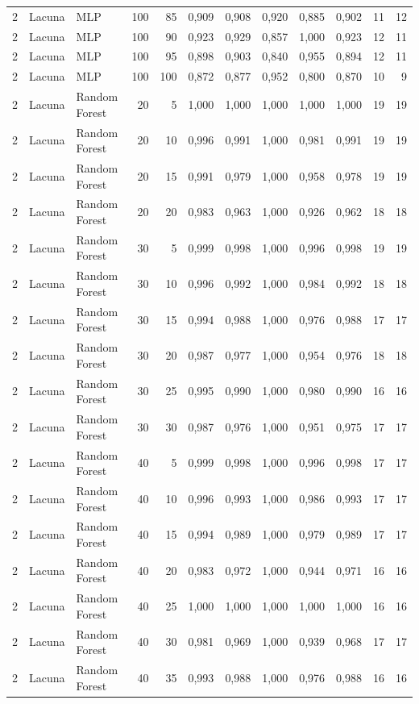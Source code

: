 \begin{longtable}{@{}rllrrrrrrrrr@{}}
2 & Lacuna & MLP & 100 & 85 & 0,909 & 0,908 & 0,920 & 0,885 & 0,902 & 11 & 12 \\
2 & Lacuna & MLP & 100 & 90 & 0,923 & 0,929 & 0,857 & 1,000 & 0,923 & 12 & 11 \\
2 & Lacuna & MLP & 100 & 95 & 0,898 & 0,903 & 0,840 & 0,955 & 0,894 & 12 & 11 \\
2 & Lacuna & MLP & 100 & 100 & 0,872 & 0,877 & 0,952 & 0,800 & 0,870 & 10 & 9 \\
2 & Lacuna & Random Forest & 20 & 5 & 1,000 & 1,000 & 1,000 & 1,000 & 1,000 & 19 & 19 \\
2 & Lacuna & Random Forest & 20 & 10 & 0,996 & 0,991 & 1,000 & 0,981 & 0,991 & 19 & 19 \\
2 & Lacuna & Random Forest & 20 & 15 & 0,991 & 0,979 & 1,000 & 0,958 & 0,978 & 19 & 19 \\
2 & Lacuna & Random Forest & 20 & 20 & 0,983 & 0,963 & 1,000 & 0,926 & 0,962 & 18 & 18 \\
2 & Lacuna & Random Forest & 30 & 5 & 0,999 & 0,998 & 1,000 & 0,996 & 0,998 & 19 & 19 \\
2 & Lacuna & Random Forest & 30 & 10 & 0,996 & 0,992 & 1,000 & 0,984 & 0,992 & 18 & 18 \\
2 & Lacuna & Random Forest & 30 & 15 & 0,994 & 0,988 & 1,000 & 0,976 & 0,988 & 17 & 17 \\
2 & Lacuna & Random Forest & 30 & 20 & 0,987 & 0,977 & 1,000 & 0,954 & 0,976 & 18 & 18 \\
2 & Lacuna & Random Forest & 30 & 25 & 0,995 & 0,990 & 1,000 & 0,980 & 0,990 & 16 & 16 \\
2 & Lacuna & Random Forest & 30 & 30 & 0,987 & 0,976 & 1,000 & 0,951 & 0,975 & 17 & 17 \\
2 & Lacuna & Random Forest & 40 & 5 & 0,999 & 0,998 & 1,000 & 0,996 & 0,998 & 17 & 17 \\
2 & Lacuna & Random Forest & 40 & 10 & 0,996 & 0,993 & 1,000 & 0,986 & 0,993 & 17 & 17 \\
2 & Lacuna & Random Forest & 40 & 15 & 0,994 & 0,989 & 1,000 & 0,979 & 0,989 & 17 & 17 \\
2 & Lacuna & Random Forest & 40 & 20 & 0,983 & 0,972 & 1,000 & 0,944 & 0,971 & 16 & 16 \\
2 & Lacuna & Random Forest & 40 & 25 & 1,000 & 1,000 & 1,000 & 1,000 & 1,000 & 16 & 16 \\
2 & Lacuna & Random Forest & 40 & 30 & 0,981 & 0,969 & 1,000 & 0,939 & 0,968 & 17 & 17 \\
2 & Lacuna & Random Forest & 40 & 35 & 0,993 & 0,988 & 1,000 & 0,976 & 0,988 & 16 & 16 \\

\end{longtable}

